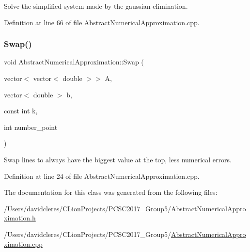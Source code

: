 Solve the simplified system made by the gaussian elimination. 



Definition at line 66 of file Abstract\+Numerical\+Approximation.\+cpp.

\mbox{\label{class_abstract_numerical_approximation_add3b93192d2decefc61151c2be292701}} 
\subsubsection{\texorpdfstring{Swap()}{Swap()}}
{\footnotesize\ttfamily void Abstract\+Numerical\+Approximation\+::\+Swap (\begin{DoxyParamCaption}\item[{vector$<$ vector$<$ double $>$$>$}]{A,  }\item[{vector$<$ double $>$}]{b,  }\item[{const int}]{k,  }\item[{int}]{number\+\_\+point }\end{DoxyParamCaption})}



Swap lines to always have the biggest value at the top, less numerical errors. 



Definition at line 24 of file Abstract\+Numerical\+Approximation.\+cpp.



The documentation for this class was generated from the following files\+:\begin{DoxyCompactItemize}
\item 
/\+Users/davidcleres/\+C\+Lion\+Projects/\+P\+C\+S\+C2017\+\_\+\+Group5/\mbox{\hyperlink{_abstract_numerical_approximation_8h}{Abstract\+Numerical\+Approximation.\+h}}\item 
/\+Users/davidcleres/\+C\+Lion\+Projects/\+P\+C\+S\+C2017\+\_\+\+Group5/\mbox{\hyperlink{_abstract_numerical_approximation_8cpp}{Abstract\+Numerical\+Approximation.\+cpp}}\end{DoxyCompactItemize}

